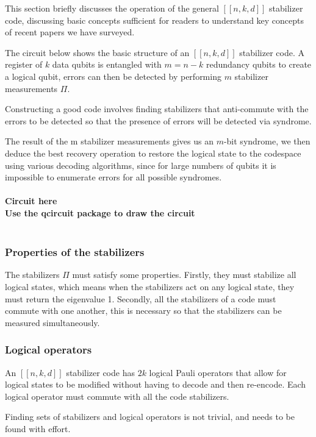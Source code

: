 
This section briefly discusses the operation of the general $[[n, k, d]]$ stabilizer code, discussing basic concepts sufficient for readers to understand key concepts of recent papers we have surveyed.

The circuit below shows the basic structure of an $[[n,k,d]]$ stabilizer code. A register of $k$ data qubits is entangled with $m = n - k$ redundancy qubits to create a logical qubit, errors can then be detected by performing $m$ stabilizer measurements $\Pi$. 

Constructing a good code involves finding stabilizers that anti-commute with the errors to be detected so that the presence of errors will be detected via syndrome.

The result of the m stabilizer measurements gives us an $m$-bit syndrome, we then deduce the best recovery operation to restore the logical state to the codespace using various decoding algorithms, since for large numbers of qubits it is impossible to enumerate errors for all possible syndromes.
\\
\\
\textbf{Circuit here}
\\
\textbf{Use the qcircuit package to draw the circuit}
\\
\\
\subsubsection{Properties of the stabilizers}

The stabilizers $\Pi$ must satisfy some properties. Firstly, they must stabilize all logical states, which means when the stabilizers act on any logical state, they must return the eigenvalue 1. Secondly, all the stabilizers of a code must commute with one another, this is necessary so that the stabilizers can be measured simultaneously.

\subsubsection{Logical operators}

An $[[n,k,d]]$ stabilizer code has $2k$ logical Pauli operators that allow for logical states to be modified without having to decode and then re-encode. Each logical operator must commute with all the code stabilizers.

Finding sets of stabilizers and logical operators is not trivial, and needs to be found with effort.

